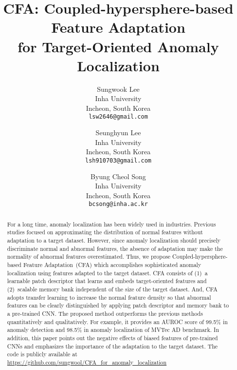 \documentclass[10pt,twocolumn,letterpaper]{article}
\begin{document}
\title{CFA: Coupled-hypersphere-based Feature Adaptation \\for Target-Oriented Anomaly Localization}

\author{Sungwook Lee\\
Inha University\\
Incheon, South Korea\\
{\tt\small lsw2646@gmail.com}
\and
Seunghyun Lee\\
Inha University\\
Incheon, South Korea\\
{\tt\small lsh910703@gmail.com}
\and
Byung Cheol Song\\
Inha University\\
Incheon, South Korea\\
{\tt\small bcsong@inha.ac.kr}
}

\maketitle

\begin{abstract}
   For a long time, anomaly localization has been widely used in industries. Previous studies focused on approximating the distribution of normal features without adaptation to a target dataset. However, since anomaly localization should precisely discriminate normal and abnormal features, the absence of adaptation may make the normality of abnormal features overestimated. Thus, we propose Coupled-hypersphere-based Feature Adaptation~(CFA) which accomplishes sophisticated anomaly localization using features adapted to the target dataset. CFA consists of (1)~a learnable patch descriptor that learns and embeds target-oriented features and (2)~scalable memory bank independent of the size of the target dataset. And, CFA adopts transfer learning to increase the normal feature density so that abnormal features can be clearly distinguished by applying patch descriptor and memory bank to a pre-trained CNN. The proposed method outperforms the previous methods quantitatively and qualitatively. For example, it provides an AUROC score of 99.5\% in anomaly detection and 98.5\% in anomaly localization of MVTec AD benchmark. In addition, this paper points out the negative effects of biased features of pre-trained CNNs and emphasizes the importance of the adaptation to the target dataset. The code is publicly available at \url{https://github.com/sungwool/CFA_for_anomaly_localization}
\end{abstract}
\end{document}
